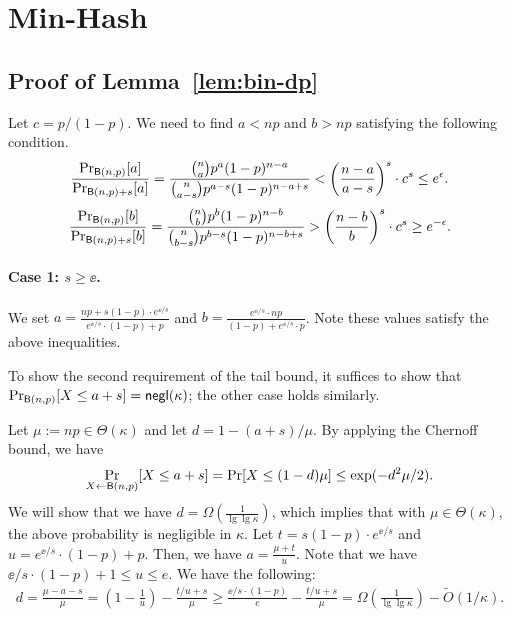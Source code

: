 
\section{Min-Hash}
\subsection{Proof of Lemma~\ref{lem:bin-dp}} \label{apx:lem:bin-dp}

Let $c= p/(1-p)$. 
We need to find $a < np$ and $b > np$ satisfying the following condition.
\begin{align*}
    \frac{\Pr_{\mathsf{B}(n,p)}[a]}{\Pr_{\mathsf{B}(n,p)+s}[a]} = 
    \frac{ \binom{n}{a} p^a (1-p)^{n-a}} 
         {  \binom{n}{a-s} p^{a-s} (1-p)^{n-a+s}} 
   < \left ( \frac{ n-a} {a -s} \right)^s  \cdot c^s 
   \le e^\epsilon.
\end{align*}
\begin{align*}
    \frac{\Pr_{\mathsf{B}(n,p)}[b]}{\Pr_{\mathsf{B}(n,p)+s}[b]} = 
    \frac{ \binom{n}{b} p^{b} (1-p)^{n-b}} 
         {  \binom{n}{b-s} p^{b-s} (1-p)^{n-b+s}}
   > \left ( \frac{ n-b} {b} \right)^s  \cdot c^s 
   \ge e^{-\epsilon}.
\end{align*}

\paragraph{Case 1: $s \ge \ee$.}
We set $a = \frac{np + s(1-p)\cdot e^{\ee/s}}{e^{\ee/s}\cdot (1-p) + p}$ and
$b = \frac{e^{\ee/s} \cdot np}{(1-p) + e^{\ee/s} \cdot p}$. Note these values satisfy the above inequalities. 

To show the second requirement of the tail bound, it suffices to show that $\Pr_{\mathsf{B}(n,p)}[X
\le a+s] = \mathsf{negl}(\kappa)$; the other case holds
similarly.

Let $\mu := np \in \Theta(\kappa)$ and let $d = 1- (a+s)/\mu$. 
By applying the Chernoff bound, we have 
\[ \Pr_{X \leftarrow \mathsf{B}(n,p)}[X \le a+s] = \Pr[ X \le (1-d) \mu ] \le
\exp(-d^2\mu/2). \]
%
We will show that we have $d = \Omega(\frac{1}{\lg\lg \kappa})$, which implies that with $\mu \in \Theta(\kappa)$, the above probability is negligible in $\kappa$. 
Let $t = s(1-p)\cdot e^{\ee/s}$ and $u  = e^{\ee/s}\cdot (1-p) + p$. Then, we have $a = \frac{\mu + t}{u}$.
Note that we have $\ee/s \cdot (1-p) + 1 \le u \le e$. We have the following: 
\begin{align*}
    d = \frac{\mu - a - s}{\mu} 
      = \left(1 - \frac{1}{u}\right) - \frac{t/u + s}{\mu}  
      \ge \frac{\ee/s \cdot (1-p)}{e} - \frac{t/u + s}{\mu}  
      = \Omega\left(\frac{1}{\lg\lg \kappa}\right) - \tilde O(1/\kappa).
\end{align*}



